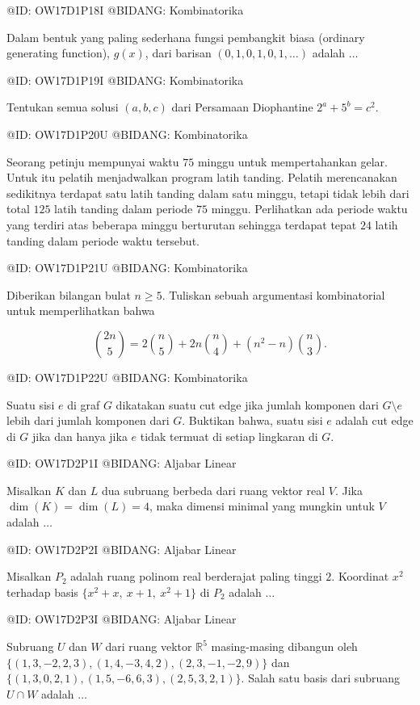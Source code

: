 @ID: OW17D1P18I
@BIDANG: Kombinatorika

Dalam bentuk yang paling sederhana fungsi pembangkit biasa (ordinary generating function), $g(x)$, dari barisan $(0,1,0,1,0,1,\ldots)$ adalah $\ldots$

@ID: OW17D1P19I
@BIDANG: Kombinatorika

Tentukan semua solusi $(a,b,c)$ dari Persamaan Diophantine $2^a+5^b=c^2$.

@ID: OW17D1P20U
@BIDANG: Kombinatorika

Seorang petinju mempunyai waktu $75$ minggu untuk mempertahankan gelar. Untuk itu pelatih menjadwalkan program latih tanding. Pelatih merencanakan sedikitnya terdapat satu latih tanding dalam satu minggu, tetapi tidak lebih dari total $125$ latih tanding dalam periode $75$ minggu. Perlihatkan ada periode waktu yang terdiri atas beberapa minggu berturutan sehingga terdapat tepat $24$ latih tanding dalam periode waktu tersebut.

@ID: OW17D1P21U
@BIDANG: Kombinatorika

Diberikan bilangan bulat $n\geq 5$. Tuliskan sebuah argumentasi kombinatorial untuk memperlihatkan bahwa

$$
\binom{2n}{5}=2\binom{n}{5}+2n\binom{n}{4}+(n^2-n)\binom{n}{3}.
$$

@ID: OW17D1P22U
@BIDANG: Kombinatorika

Suatu sisi $e$ di graf $G$ dikatakan suatu cut edge jika jumlah komponen dari $G\setminus e$ lebih dari jumlah komponen dari $G$. Buktikan bahwa, suatu sisi $e$ adalah cut edge di $G$ jika dan hanya jika $e$ tidak termuat di setiap lingkaran di $G$.

@ID: OW17D2P1I
@BIDANG: Aljabar Linear

Misalkan $K$ dan $L$ dua subruang berbeda dari ruang vektor real $V$. Jika $\dim(K)=\dim(L)=4$, maka dimensi minimal yang mungkin untuk $V$ adalah $\ldots$

@ID: OW17D2P2I
@BIDANG: Aljabar Linear

Misalkan $P_2$ adalah ruang polinom real berderajat paling tinggi $2$. Koordinat $x^2$ terhadap basis $\{x^2+x,\ x+1,\ x^2+1\}$ di $P_2$ adalah $\ldots$

@ID: OW17D2P3I
@BIDANG: Aljabar Linear

Subruang $U$ dan $W$ dari ruang vektor $\mathbb R^5$ masing-masing dibangun oleh $\{(1,3,-2,2,3),(1,4,-3,4,2),(2,3,-1,-2,9)\}$ dan $\{(1,3,0,2,1),(1,5,-6,6,3),(2,5,3,2,1)\}$. Salah satu basis dari subruang $U\cap W$ adalah $\ldots$


